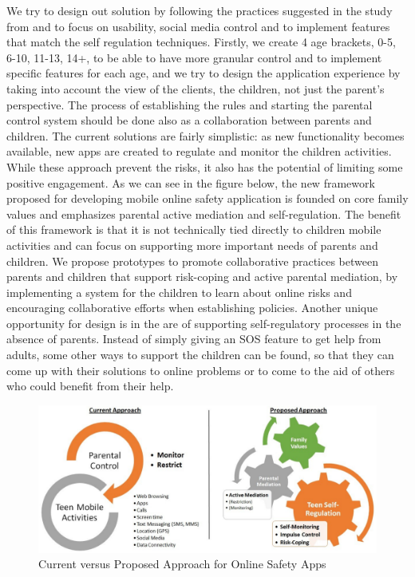 We try to design out solution by following the practices suggested in the study from \parencite{wisniewski2017parental} and to focus on usability, social media control and to implement features that match the self regulation techniques. Firstly, we create 4 age brackets, 0-5, 6-10, 11-13, 14+, to be able to have more granular control and to implement specific features for each age, and we try to design the application experience by taking into account the view of the clients, the children, not just the parent's perspective. The process of establishing the rules and starting the parental control system should be done also as a collaboration between parents and children. The current solutions are fairly simplistic: as new functionality becomes available, new apps are created to regulate and monitor the children activities. While these approach prevent the risks, it also has the potential of limiting some positive engagement. As we can see in the figure below, the new framework proposed for developing mobile online safety application is founded on core family values and emphasizes parental active mediation and self-regulation. The benefit of this framework is that it is not technically tied directly to children mobile activities and can focus on supporting more important needs of parents and children. We propose prototypes to promote collaborative practices between parents and children that support risk-coping and active parental mediation, by implementing a system for the children to learn about online risks and encouraging collaborative efforts when establishing policies. Another unique opportunity for design is in the are of supporting self-regulatory processes in the absence of parents. Instead of simply giving an SOS feature to get help from adults, some other ways to support the children can be found, so that they can come up with their solutions to online problems or to come to the aid of others who could benefit from their help.

\begin{figure}[th]
\centering
\includegraphics[width=1\textwidth]{Figures/current-vs-proposed}
\decoRule
\caption{Current versus Proposed Approach for Online Safety Apps}
\label{fig:current-vs-proposed}
\end{figure}

